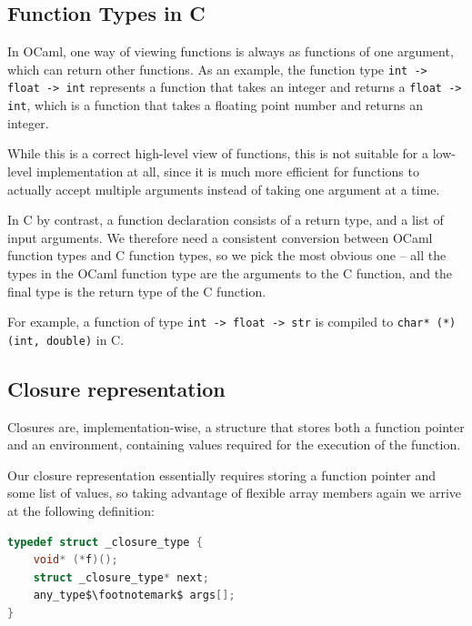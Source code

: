 \subsection{Function Types in C} \label{function-typing}

In OCaml, one way of viewing functions is always as functions of one argument,
which can return other functions. As an example, the function type \texttt{int
-> float -> int} represents a function that takes an integer and returns a
\texttt{float -> int}, which is a function that takes a floating point number
and returns an integer.

While this is a correct high-level view of functions, this is not suitable for a
low-level implementation at all, since it is much more efficient for functions
to actually accept multiple arguments instead of taking one argument at a time.

In C by contrast, a function declaration consists of a return type, and a list 
of input arguments. We therefore need a consistent conversion between OCaml 
function types and C function types, so we pick the most obvious one -- all the 
types in the OCaml function type are the arguments to the C function, and the 
final type is the return type of the C function.

For example, a function of type \texttt{int -> float -> str} is compiled to
\texttt{char* (*)(int, double)} in C.

\subsection{Closure representation}

Closures are, implementation-wise, a structure that stores both a function 
pointer and an environment, containing values required for the execution of the 
function.

Our closure representation essentially requires storing a function pointer and 
some list of values, so taking advantage of flexible array members again we 
arrive at the following definition:

\begin{lstlisting}[language=C]
typedef struct _closure_type {
    void* (*f)();
    struct _closure_type* next;
    any_type$\footnotemark$ args[];
}
\end{lstlisting}


